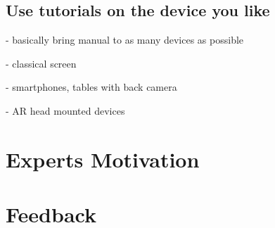 		\subsection{Use tutorials on the device you like}
		
			- basically bring manual to as many devices as possible
			
			- classical screen
			
			- smartphones, tables with back camera
			
			- AR head mounted devices

	\section{Experts Motivation}
	
	\section{Feedback}

%
%

